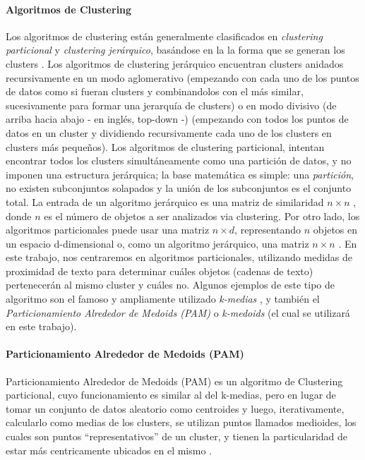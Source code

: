 \paragraph{Algoritmos de Clustering}
Los algoritmos de clustering están generalmente clasificados en \textit{clustering particional} y \textit{clustering jerárquico}, basándose en la la forma que se generan los clusters \citep{xu2008clustering}. Los algoritmos de clustering jerárquico encuentran clusters anidados recursivamente en un modo aglomerativo (empezando con cada uno de los puntos de datos como si fueran clusters y combinandolos con el más similar, sucesivamente para formar una jerarquía de clusters) o en modo divisivo (de arriba hacia abajo - en inglés, top-down -) (empezando con todos los puntos de datos en un cluster y dividiendo recursivamente cada uno de los clusters en clusters más pequeños). Los algoritmos de clustering particional, intentan encontrar todos los clusters simultáneamente como una partición de datos, y no imponen una estructura jerárquica; la base matemática es simple: una \textit{partición}, no existen subconjuntos solapados y la unión de los subconjuntos es el conjunto total. La entrada de un algoritmo jerárquico es una matriz de similaridad \(n \times n\) , donde \(n\) es el número de objetos a ser analizados via clustering. Por otro lado, los algoritmos particionales puede usar una matriz \(n \times d\), representando \(n\) objetos en un espacio d-dimensional o, como un algoritmo jerárquico, una matriz \(n \times n\) \citep{jain2010data}.
En este trabajo, nos centraremos en algoritmos particionales, utilizando medidas de proximidad de texto para determinar cuáles objetos (cadenas de texto) pertenecerán al mismo cluster y cuáles no. Algunos ejemplos de este tipo de algoritmo son el famoso y ampliamente utilizado \textit{k-medias} \citep{macqueen1967some}, y también el \textit{Particionamiento Alrededor de Medoids (PAM)} o \textit{k-medoids} (el cual se utilizará en este trabajo).

\paragraph{Particionamiento Alrededor de Medoids (PAM)}
Particionamiento Alrededor de Medoids (PAM) es un algoritmo de Clustering particional, cuyo funcionamiento es similar al del k-medias, pero en lugar de tomar un conjunto de datos aleatorio como centroides y luego, iterativamente, calcularlo como medias de los clusters, se utilizan puntos llamados medioides, los cuales son puntos “representativos” de un cluster, y tienen la particularidad de estar más centricamente ubicados en el mismo \citep{rdusseeun1987clustering}.


